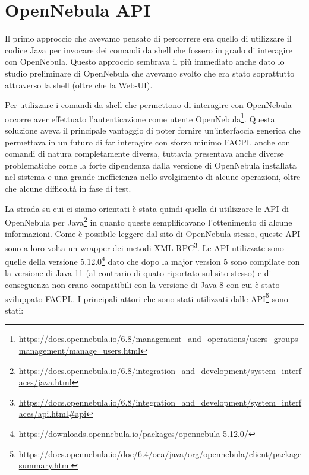 \section{OpenNebula API}
Il primo approccio che avevamo pensato di percorrere era quello di utilizzare il codice Java per invocare dei comandi da shell che fossero in grado di interagire con OpenNebula. Questo approccio sembrava il più immediato anche dato lo studio preliminare di OpenNebula che avevamo svolto che era stato soprattutto attraverso la shell (oltre che la Web-UI).\par
Per utilizzare i comandi da shell che permettono di interagire con OpenNebula occorre aver effettuato l'autenticazione come utente OpenNebula\footnote{\url{https://docs.opennebula.io/6.8/management_and_operations/users_groups_management/manage_users.html}}.
Questa soluzione aveva il principale vantaggio di poter fornire un'interfaccia generica che permettava in un futuro di far interagire con sforzo minimo FACPL anche con comandi di natura completamente diversa, tuttavia presentava anche diverse problematiche come la forte dipendenza dalla versione di OpenNebula installata nel sistema e una grande inefficienza nello svolgimento di alcune operazioni, oltre che alcune difficoltà in fase di test.\par
La strada su cui ci siamo orientati è stata quindi quella di utilizzare le API di OpenNebula per Java\footnote{\url{https://docs.opennebula.io/6.8/integration_and_development/system_interfaces/java.html}} in quanto queste semplificavano l'ottenimento di alcune informazioni. Come è possibile leggere dal sito di OpenNebula stesso, queste API sono a loro volta un wrapper dei metodi XML-RPC\footnote{\url{https://docs.opennebula.io/6.8/integration_and_development/system_interfaces/api.html\#api}}.
Le API utilizzate sono quelle della versione 5.12.0\footnote{\url{https://downloads.opennebula.io/packages/opennebula-5.12.0/}} dato che dopo la major version 5 sono compilate con la versione di Java 11 (al contrario di quato riportato sul sito stesso) e di conseguenza non erano compatibili con la versione di Java 8 con cui è stato sviluppato FACPL.
I principali attori che sono stati utilizzati dalle API\footnote{\url{https://docs.opennebula.io/doc/6.4/oca/java/org/opennebula/client/package-summary.html}} sono stati:

